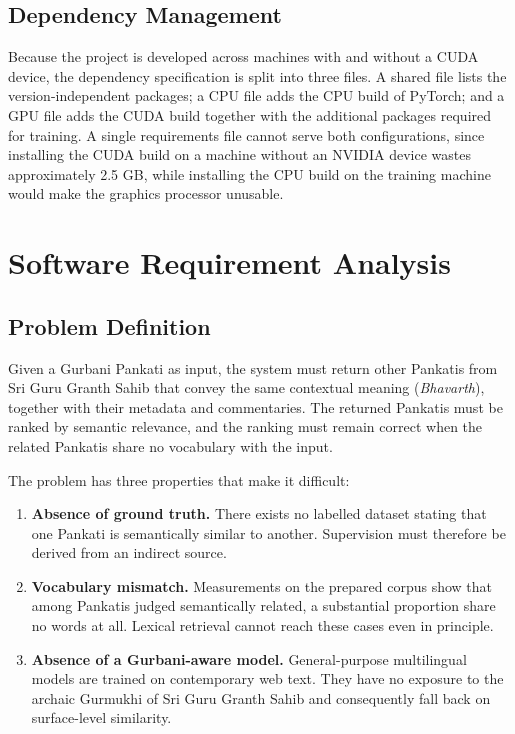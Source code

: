 \documentclass[12pt,a4paper]{article}
\begin{document}
\subsection{Dependency Management}

Because the project is developed across machines with and without a CUDA device, the dependency specification is split into three files. A shared file lists the version-independent packages; a CPU file adds the CPU build of PyTorch; and a GPU file adds the CUDA build together with the additional packages required for training. A single requirements file cannot serve both configurations, since installing the CUDA build on a machine without an NVIDIA device wastes approximately 2.5 GB, while installing the CPU build on the training machine would make the graphics processor unusable.


\newpage
\section{Software Requirement Analysis}

\subsection{Problem Definition}

Given a Gurbani Pankati as input, the system must return other Pankatis from Sri Guru Granth Sahib that convey the same contextual meaning (\textit{Bhavarth}), together with their metadata and commentaries. The returned Pankatis must be ranked by semantic relevance, and the ranking must remain correct when the related Pankatis share no vocabulary with the input.

The problem has three properties that make it difficult:

\begin{enumerate}[leftmargin=*, label=(\alph*), itemsep=0.2cm]
    \item \textbf{Absence of ground truth.} There exists no labelled dataset stating that one Pankati is semantically similar to another. Supervision must therefore be derived from an indirect source.

    \item \textbf{Vocabulary mismatch.} Measurements on the prepared corpus show that among Pankatis judged semantically related, a substantial proportion share no words at all. Lexical retrieval cannot reach these cases even in principle.

    \item \textbf{Absence of a Gurbani-aware model.} General-purpose multilingual models \cite{kakwani2020indicnlpsuite, ramesh2022samanantar, deode2023indicsbert} are trained on contemporary web text. They have no exposure to the archaic Gurmukhi of Sri Guru Granth Sahib and consequently fall back on surface-level similarity.
\end{enumerate}
\end{document}
